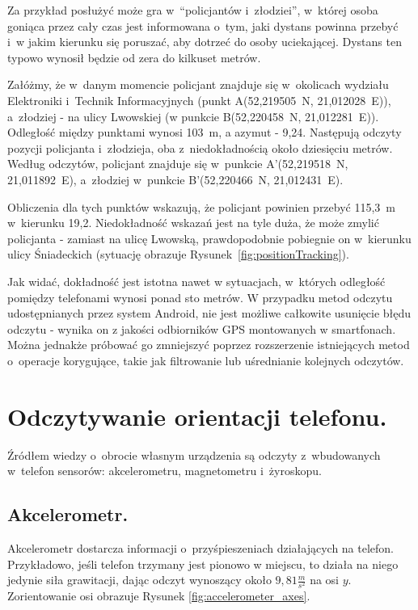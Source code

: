 \documentclass[a4paper,twocolumn,11pt]{article}
\begin{document}
 Za przykład posłużyć może gra w~``policjantów i~złodziei'', w~której osoba goniąca przez cały czas jest informowana o~tym, jaki dystans powinna przebyć i~w jakim kierunku się poruszać, aby dotrzeć do osoby uciekającej.
 Dystans ten typowo wynosił będzie od zera do kilkuset metrów.
 
 Załóżmy, że w~danym momencie policjant znajduje się w~okolicach wydziału Elektroniki i~Technik Informacyjnych (punkt A(52,219505\textdegree~N, 21,012028\textdegree~E)), a~złodziej - na ulicy Lwowskiej (w punkcie B(52,220458\textdegree~N, 21,012281\textdegree~E)).
 Odległość między punktami wynosi 103~m, a azymut - 9,24\textdegree.
 Następują odczyty pozycji policjanta i~złodzieja, oba z~niedokładnością około dziesięciu metrów.
 Według odczytów, policjant znajduje się w~punkcie A'(52,219518\textdegree~N, 21,011892\textdegree~E), a~złodziej w~punkcie B'(52,220466\textdegree~N, 21,012431\textdegree~E).
 
 Obliczenia dla tych punktów wskazują, że policjant powinien przebyć 115,3~m w~kierunku 19,2\textdegree.
 Niedokładność wskazań jest na tyle duża, że może zmylić policjanta - zamiast na ulicę Lwowską, prawdopodobnie pobiegnie on w~kierunku ulicy Śniadeckich (sytuację obrazuje Rysunek~\ref{fig:positionTracking}).


 
 Jak widać, dokładność jest istotna nawet w sytuacjach, w~których odległość pomiędzy telefonami wynosi ponad sto metrów.
 W przypadku metod odczytu udostępnianych przez system Android, nie jest możliwe całkowite usunięcie błędu odczytu - wynika on z jakości odbiorników GPS montowanych w smartfonach. Można jednakże próbować go zmniejszyć poprzez rozszerzenie istniejących metod o~operacje korygujące, takie jak filtrowanie lub uśrednianie kolejnych odczytów.




\section{Odczytywanie orientacji telefonu.} \label{sec:orientation_tracking}

Źródłem wiedzy o~obrocie własnym urządzenia są odczyty z~wbudowanych w~telefon sensorów: akcelerometru, magnetometru i~żyroskopu.


\subsection{Akcelerometr.}
 Akcelerometr dostarcza informacji o~przyśpieszeniach działających na telefon.
 Przykładowo, jeśli telefon trzymany jest pionowo w miejscu, to działa na niego jedynie siła grawitacji, dając odczyt wynoszący około $9,81\frac{m}{s^2}$ na osi $y$.
 Zorientowanie osi obrazuje Rysunek \ref{fig:accelerometer_axes}.
 
\end{document}
